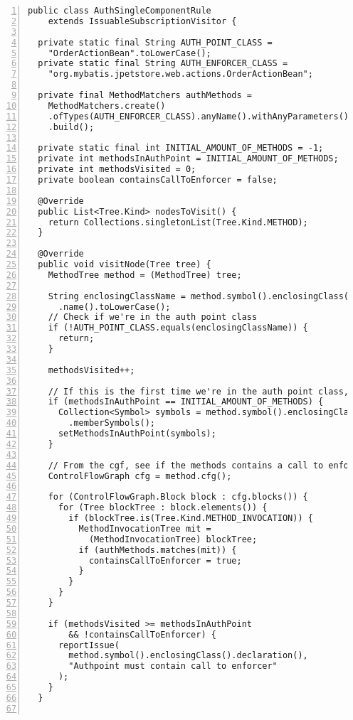 \begin{lstlisting}[caption={Constraint 2. This rule ensures that at least one method in the authentication point calls the authentication enforcer.}, captionpos=b, label=lst:sq_2, numbers=left, showstringspaces=false]
public class AuthSingleComponentRule
    extends IssuableSubscriptionVisitor {

  private static final String AUTH_POINT_CLASS =
    "OrderActionBean".toLowerCase();
  private static final String AUTH_ENFORCER_CLASS =
    "org.mybatis.jpetstore.web.actions.OrderActionBean";

  private final MethodMatchers authMethods =
    MethodMatchers.create()
    .ofTypes(AUTH_ENFORCER_CLASS).anyName().withAnyParameters()
    .build();

  private static final int INITIAL_AMOUNT_OF_METHODS = -1;
  private int methodsInAuthPoint = INITIAL_AMOUNT_OF_METHODS;
  private int methodsVisited = 0;
  private boolean containsCallToEnforcer = false;

  @Override
  public List<Tree.Kind> nodesToVisit() {
    return Collections.singletonList(Tree.Kind.METHOD);
  }

  @Override
  public void visitNode(Tree tree) {
    MethodTree method = (MethodTree) tree;

    String enclosingClassName = method.symbol().enclosingClass()
      .name().toLowerCase();
    // Check if we're in the auth point class
    if (!AUTH_POINT_CLASS.equals(enclosingClassName)) {
      return;
    }

    methodsVisited++;

    // If this is the first time we're in the auth point class, calculate the number of methods
    if (methodsInAuthPoint == INITIAL_AMOUNT_OF_METHODS) {
      Collection<Symbol> symbols = method.symbol().enclosingClass()
        .memberSymbols();
      setMethodsInAuthPoint(symbols);
    }

    // From the cgf, see if the methods contains a call to enforcer class
    ControlFlowGraph cfg = method.cfg();

    for (ControlFlowGraph.Block block : cfg.blocks()) {
      for (Tree blockTree : block.elements()) {
        if (blockTree.is(Tree.Kind.METHOD_INVOCATION)) {
          MethodInvocationTree mit =
            (MethodInvocationTree) blockTree;
          if (authMethods.matches(mit)) {
            containsCallToEnforcer = true;
          }
        }
      }
    }

    if (methodsVisited >= methodsInAuthPoint
        && !containsCallToEnforcer) {
      reportIssue(
        method.symbol().enclosingClass().declaration(),
        "Authpoint must contain call to enforcer"
      );
    }
  }


\end{lstlisting}
